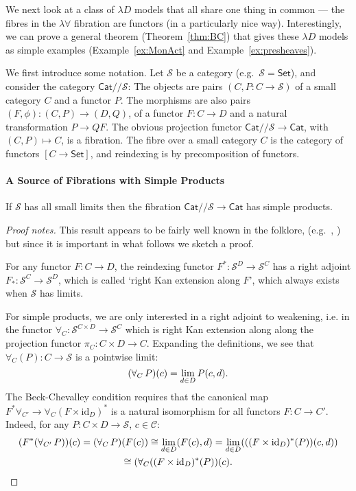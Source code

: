 \documentclass[a4paper,UKenglish]{lipics}
\newcommand{\msf}[1]{\mathsf{#1}} %
\newcommand{\Set}{\msf{Set}}
\newcommand{\Cat}{\msf{Cat}}
\newcommand{\lslice}{/\!/}
\newcommand{\id}{\mathrm{id}}
\begin{document}
We next look at a class of $\lambda D$ models that all share one thing in common --- the fibres in the $\lambda \forall$ fibration are functors (in a particularly nice way). Interestingly, we can prove a general theorem (Theorem~\ref{thm:BC}) that gives these $\lambda D$ models as simple examples (Example~\ref{ex:MonAct} and Example~\ref{ex:presheaves}).

We first introduce some notation.
Let $\mathcal S$ be a category (e.g.~$\mathcal S=\Set$), and
consider the category $\Cat\lslice\mathcal S$:
The objects are pairs $(C,P:C\to \mathcal S)$ of a small category $C$ and a functor $P$.
The morphisms are also pairs $(F,\phi):(C,P)\to (D,Q)$,
of a functor $F:C\to D$ and a natural transformation
$P\to QF$.
The obvious projection functor $\Cat\lslice \mathcal S\to \Cat$,
with $(C,P)\mapsto C$,
is a fibration. The fibre over a small category $C$ is the category
of functors $[C\to\Set]$, and reindexing is by precomposition of functors.

\paragraph*{A Source of Fibrations with Simple Products}
\begin{theorem}
\label{thm:BC}
If $\mathcal S$ has all small limits
then the fibration $\Cat\lslice \mathcal S\to \Cat$ has simple products.
\end{theorem}
\begin{proof}[Proof notes]
This result appears to be fairly well known in the folklore,
(e.g.~\cite[end of \S 3]{lawvere-adjointness}, \cite{mellies-zeilberger})
but since it is important in what follows we sketch a proof.

For any functor $F:C\to D$,
the reindexing functor $F^*:\mathcal S^D\to \mathcal S^C$
has a right adjoint
$F_*:\mathcal S^C\to\mathcal S^D$, which is called `right Kan extension along $F$',
which always exists when $\mathcal S$ has limits.

For simple products, we are only interested in a right adjoint to weakening,
i.e. in the functor $\forall_C:\mathcal S^{C\times D}\to \mathcal S^C$
which is right Kan extension along
along the projection functor $\pi_C:C\times D\to C$.
Expanding the definitions, we see that $\forall_C(P):C\to\mathcal S$ is
a pointwise limit:
\begin{equation}
(\forall_C\,P)(c)=\lim_{d\in D}P(c,d)\text.
\label{eqn:forall-limit}
\end{equation}
The Beck-Chevalley condition requires that the canonical map
$
F^*\forall_{C'}
\to
\forall_{C}(F\times \id_D)^*
$
is a natural isomorphism for all functors $F:C\to C'$.
Indeed, for any
$P:C\times D\to \mathcal S$, $c\in \mathcal C$:
\begin{multline*}
(F^*(\forall_{C'}\,P))(c)
=
(\forall_C\,P)(F(c))
\cong
\lim_{d\in D}(F(c),d)
=
\lim_{d\in D}(((F\times \id_D)^*(P))(c,d))
\\\cong
(\forall_{C}((F\times \id_D)^*(P))(c)
\text.
\end{multline*}
\end{proof}
\end{document}
